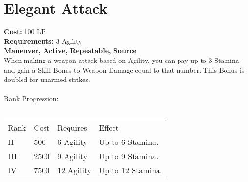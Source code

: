 \section{Elegant Attack}\label{maneuver:elegantAttack}
\textbf{Cost:} 100 LP\\
\textbf{Requirements:} 3 Agility\\
\textbf{Maneuver, Active, Repeatable, Source}\\
When making a weapon attack based on Agility, you can pay up to 3 Stamina and gain a Skill Bonus to Weapon Damage equal to that number.
This Bonus is doubled for unarmed strikes.\\
\\
Rank Progression:\\
\\
\begin{tabular}{l | l | l | l}
	Rank & Cost & Requires & Effect\\
	II & 500 & 6 Agility & Up to 6 Stamina.\\
	III & 2500 & 9 Agility & Up to 9 Stamina.\\
	IV & 7500 & 12 Agility & Up to 12 Stamina.\\
\end{tabular}